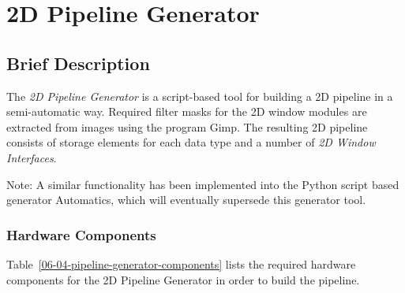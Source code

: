 


\section{2D Pipeline Generator} \label{ch:06-04-tools-pipegen}


\subsection{Brief Description}
The \textit{2D Pipeline Generator} is a script-based tool for building a 2D pipeline in a semi-automatic way.
Required filter masks for the 2D window modules are extracted from images using the program Gimp.
The resulting 2D pipeline consists of storage elements for each data type and a number of \textit{2D Window Interfaces}.

Note: A similar functionality has been implemented into the Python script based generator Automatics, which will eventually supersede this generator tool.

\subsubsection{Hardware Components}

Table~\ref{06-04-pipeline-generator-components} lists the required hardware components for the 2D Pipeline Generator in order to build the pipeline.

